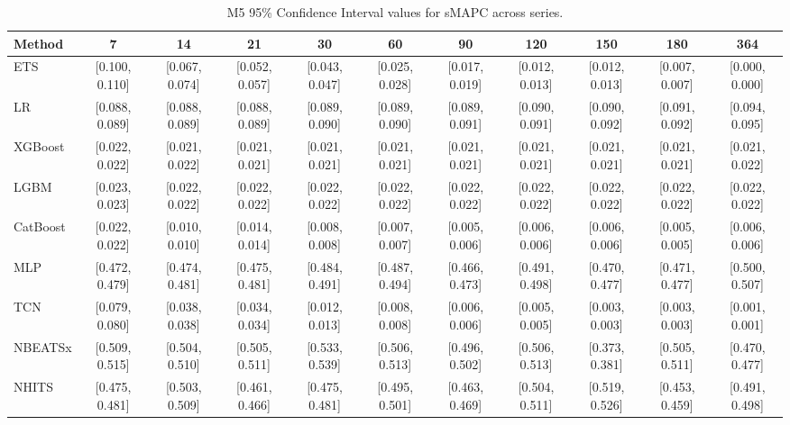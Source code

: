 \begin{table}[!ht]
\centering
\begin{adjustbox}{max width=\textwidth}
\begin{tabular}{lcccccccccc}
\toprule
Method & 7 & 14 & 21 & 30 & 60 & 90 & 120 & 150 & 180 & 364 \\
\midrule
ETS & [0.100, 0.110] & [0.067, 0.074] & [0.052, 0.057] & [0.043, 0.047] & [0.025, 0.028] & [0.017, 0.019] & [0.012, 0.013] & [0.012, 0.013] & [0.007, 0.007] & [0.000, 0.000] \\
LR & [0.088, 0.089] & [0.088, 0.089] & [0.088, 0.089] & [0.089, 0.090] & [0.089, 0.090] & [0.089, 0.091] & [0.090, 0.091] & [0.090, 0.092] & [0.091, 0.092] & [0.094, 0.095] \\
XGBoost & [0.022, 0.022] & [0.021, 0.022] & [0.021, 0.021] & [0.021, 0.021] & [0.021, 0.021] & [0.021, 0.021] & [0.021, 0.021] & [0.021, 0.021] & [0.021, 0.021] & [0.021, 0.022] \\
LGBM & [0.023, 0.023] & [0.022, 0.022] & [0.022, 0.022] & [0.022, 0.022] & [0.022, 0.022] & [0.022, 0.022] & [0.022, 0.022] & [0.022, 0.022] & [0.022, 0.022] & [0.022, 0.022] \\
CatBoost & [0.022, 0.022] & [0.010, 0.010] & [0.014, 0.014] & [0.008, 0.008] & [0.007, 0.007] & [0.005, 0.006] & [0.006, 0.006] & [0.006, 0.006] & [0.005, 0.005] & [0.006, 0.006] \\
MLP & [0.472, 0.479] & [0.474, 0.481] & [0.475, 0.481] & [0.484, 0.491] & [0.487, 0.494] & [0.466, 0.473] & [0.491, 0.498] & [0.470, 0.477] & [0.471, 0.477] & [0.500, 0.507] \\
TCN & [0.079, 0.080] & [0.038, 0.038] & [0.034, 0.034] & [0.012, 0.013] & [0.008, 0.008] & [0.006, 0.006] & [0.005, 0.005] & [0.003, 0.003] & [0.003, 0.003] & [0.001, 0.001] \\
NBEATSx & [0.509, 0.515] & [0.504, 0.510] & [0.505, 0.511] & [0.533, 0.539] & [0.506, 0.513] & [0.496, 0.502] & [0.506, 0.513] & [0.373, 0.381] & [0.505, 0.511] & [0.470, 0.477] \\
NHITS & [0.475, 0.481] & [0.503, 0.509] & [0.461, 0.466] & [0.475, 0.481] & [0.495, 0.501] & [0.463, 0.469] & [0.504, 0.511] & [0.519, 0.526] & [0.453, 0.459] & [0.491, 0.498] \\
\bottomrule
\end{tabular}
\end{adjustbox}
\caption{M5 95\% Confidence Interval values for sMAPC across series.}
\label{tab:ci_m5_smapc}
\end{table}

